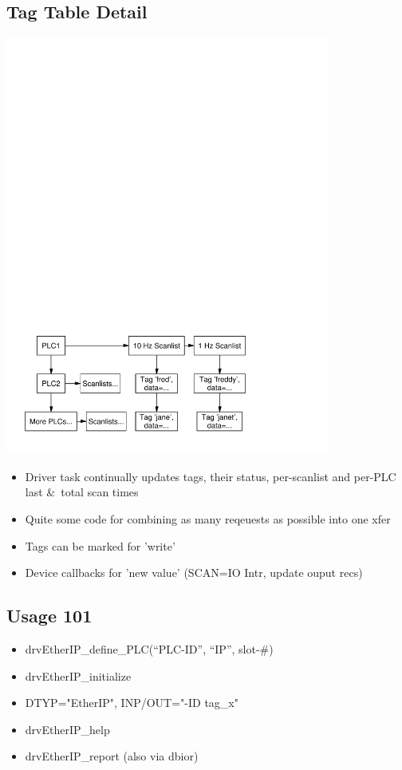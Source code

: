 \documentclass[letterpaper,landscape]{article}
\begin{document}
\begin{slide}
\section{Tag Table Detail}
\includegraphics[width=0.8\textwidth]{tagtable}
\begin{itemize}
\item Driver task continually updates tags, their status, per-scanlist
  and per-PLC last \&\ total scan times 
\item Quite some code for combining as many reqeuests as possible into
  one xfer
\item Tags can be marked for 'write'
\item Device callbacks for 'new value' (SCAN=IO Intr, update ouput recs)
\end{itemize}
\end{slide}

\begin{slide}
\section{Usage 101}
\begin{itemize}
\item drvEtherIP\_define\_PLC(``PLC-ID'', ``IP'', slot-\#)
\item drvEtherIP\_initialize
\item DTYP="EtherIP", INP/OUT="\@PLC-ID tag\_x"
\item drvEtherIP\_help
\item drvEtherIP\_report (also via dbior)
\end{itemize}
\vfill
~~
\end{slide}
\end{document}

